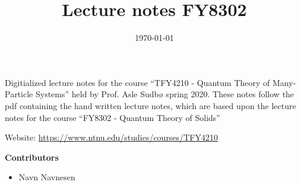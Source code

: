 \documentclass{article}
\title{Lecture notes FY8302}
\date{\today}
\theoremstyle{definition}
\newcommand{\contribs}{%
\begin{center}
\Large 
\textbf{Contributors}
\end{center}


\begin{itemize}
\item Navn Navnesen
\end{itemize}

}
\begin{document}
\maketitle
Digitialized lecture notes for the course ``TFY4210 - Quantum Theory of Many-Particle Systems'' held by Prof. Asle Sudbø spring 2020. These notes follow the pdf containing the hand written lecture notes, which are based upon the lecture notes for the course ``FY8302 - Quantum Theory of Solids''

Website: \href{https://www.ntnu.edu/studies/courses/TFY4210}{https://www.ntnu.edu/studies/courses/TFY4210}
\contribs
\tableofcontents



\end{document}
